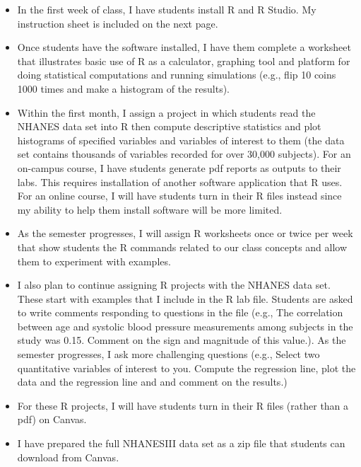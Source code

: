 \documentclass[10pt]{article}
\begin{document}
\begin{itemize}
\item In the first week of class, I have students install R and R Studio.  My instruction sheet
is included on the next page.  
\item Once students have the software installed, I have them complete a worksheet that 
illustrates basic use of R as a calculator, graphing tool and platform for doing statistical
  computations and running simulations (e.g., flip 10 coins 1000 times and make a histogram of the 
  results).
\item Within the first month, I assign a project in which students read the NHANES data set
  into R then compute descriptive statistics and plot histograms of specified variables and
  variables of interest to them (the data set contains thousands of variables recorded for 
  over 30,000 subjects).   For an on-campus course, I have students generate pdf reports as
  outputs to their labs.  This requires installation of another software application that R 
  uses.  For an online course, I will have students turn in their R files instead since my
  ability to help them install software will be more limited.
\item As the semester progresses, I will assign R worksheets once or twice per week 
  that show students the R commands related to our class concepts and allow them to 
  experiment with examples.
\item I also plan to continue assigning R projects with the NHANES data set.  These start
   with examples that I include in the R lab file.  Students are asked to write comments
   responding to questions in the file (e.g., The correlation between age and systolic 
   blood pressure measurements among subjects in the study was 0.15.  Comment on the 
   sign and magnitude of this value.).  As the semester progresses, I ask more challenging
   questions (e.g., Select two quantitative variables of interest to you.  Compute the 
   regression line, plot the data and the regression line and and comment on the results.)
\item For these R projects, I will have students turn in their R files (rather than a pdf) on 
   Canvas.
\item I have prepared the full NHANESIII data set as a zip file that students can download
from Canvas.
\end{itemize}
\end{document}
